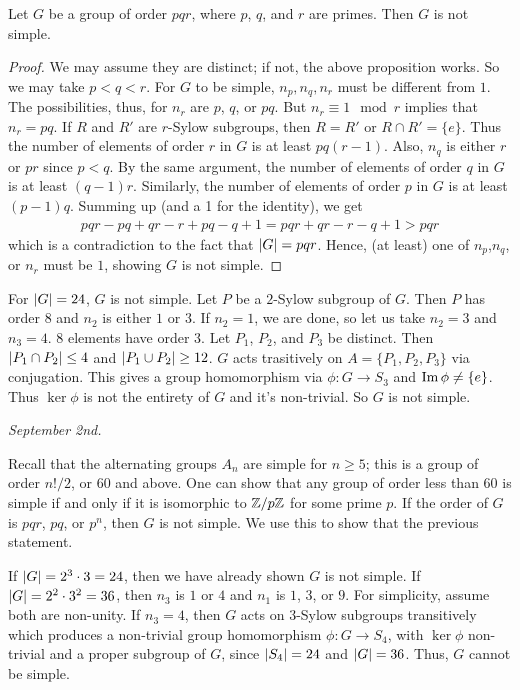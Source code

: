 \begin{proposition}
    Let $G$ be a group of order $pqr$, where $p$, $q$, and $r$ are primes. Then $G$ is not simple.
\end{proposition}
\begin{proof}
    We may assume they are distinct; if not, the above proposition works. So we may take $p < q < r$. For $G$ to be simple, $n_{p},n_{q},n_{r}$ must be different from $1$. The possibilities, thus, for $n_{r}$ are $p$, $q$, or $pq$. But $n_{r} \equiv 1 \mod r$ implies that $n_{r} = pq$. If $R$ and $R'$ are $r$-Sylow subgroups, then $R = R'$ or $R \cap R' = \{e\}$. Thus the number of elements of order $r$ in $G$ is at least $pq(r-1)$. Also, $n_{q}$ is either $r$ or $pr$ since $p < q$. By the same argument, the number of elements of order $q$ in $G$ is at least $(q-1)r$. Similarly, the number of elements of order $p$ in $G$ is at least $(p-1)q$. Summing up (and a 1 for the identity), we get
    \begin{align}
        pqr - pq + qr - r + pq - q + 1 = pqr + qr - r - q + 1 > pqr
    \end{align}
    which is a contradiction to the fact that $\left| G \right| = pqr$. Hence, (at least) one of $n_{p}$,$n_{q}$, or $n_{r}$ must be $1$, showing $G$ is not simple.
\end{proof}

\begin{example}
    For $\left| G \right| = 24$, $G$ is not simple. Let $P$ be a $2$-Sylow subgroup of $G$. Then $P$ has order $8$ and $n_{2}$ is either $1$ or $3$. If $n_{2} = 1$, we are done, so let us take $n_{2} = 3$ and $n_{3} = 4$. $8$ elements have order $3$. Let $P_{1}$, $P_{2}$, and $P_{3}$ be distinct. Then $\left| P_{1} \cap P_{2} \right| \leq 4$ and $\left| P_{1} \cup P_{2} \right| \geq 12$. $G$ acts trasitively on $A = \{P_{1},P_{2},P_{3}\}$ via conjugation. This gives a group homomorphism via $\phi:G \to S_{3}$ and $\operatorname{Im} \phi \neq \{e\}$. Thus $\ker \phi$ is not the entirety of $G$ and it's non-trivial. So $G$ is not simple.
\end{example}
\noindent \textit{September 2nd.}

Recall that the alternating groups $A_{n}$ are simple for $n \geq 5$; this is a group of order $n!/2$, or $60$ and above. One can show that any group of order less than $60$ is simple if and only if it is isomorphic to $\mathbb{Z}/p\mathbb{Z}$ for some prime $p$. If the order of $G$ is $pqr$, $pq$, or $p^{n}$, then $G$ is not simple. We use this to show that the previous statement.

If $\left| G \right| = 2^{3} \cdot 3 = 24$, then we have already shown $G$ is not simple. If $\left| G \right| = 2^{2} \cdot 3^{2} = 36$, then $n_{3}$ is $1$ or $4$ and $n_{1}$ is $1$, $3$, or $9$. For simplicity, assume both are non-unity. If $n_{3} = 4$, then $G$ acts on $3$-Sylow subgroups transitively which produces a non-trivial group homomorphism $\phi:G \to S_{4}$, with $\ker \phi$ non-trivial and a proper subgroup of $G$, since $\left| S_{4} \right| = 24$ and $\left| G \right| = 36$. Thus, $G$ cannot be simple.

